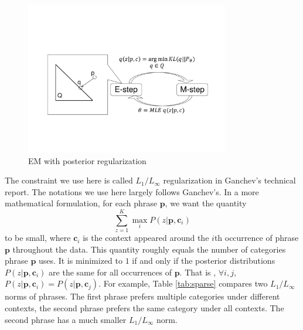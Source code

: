 \begin{figure}[h]
  \centering
  \includegraphics[width=3.5in]{pr-clustering/EMPR}
  \caption{EM with posterior regularization}
  \label{fig:EMPR}
\end{figure}

The constraint we use here is called $L_1/ L_\infty$
regularization in Ganchev's technical report. The notations
we use here largely follows Ganchev's.
In a more mathematical formulation, for each phrase $\textbf{p}$,
we want the quantity 
\begin{equation}\label{eq:sparsity}
\sum_{z=1}^K \max_i P(z|\textbf{p},\textbf{c}_i) 
\end{equation}
to be small, where $\textbf{c}_i$ is the context
appeared around the $i$th occurrence of phrase $\textbf{p}$
throughout the data. This quantity roughly equals 
the number of categories phrase $\textbf{p}$ uses.
It is minimized to $1$ if and only if
the posterior distributions $P(z|\textbf{p},\textbf{c}_i)$
are the same
for all
occurrences of $\textbf{p}$. That is ,
$\forall i,j$, 
$P(z|\textbf{p},\textbf{c}_i)=P(z|\textbf{p},\textbf{c}_j)$. 
For example, Table \ref{tab:sparse} compares two $L_1/L_{\infty}$
norms of phrases. The first phrase prefers multiple categories
under different contexts, the second phrase prefers
the same category under all contexts. The second phrase
has a much smaller $L_1/L_{\infty}$ norm.

